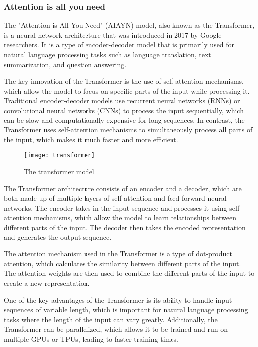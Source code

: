 \subsubsection{Attention is all you need}

The "Attention is All You Need" (AIAYN) model, also known as the Transformer, is a neural network architecture that was introduced in 2017 by Google researchers.
It is a type of encoder-decoder model that is primarily used for natural language processing tasks such as language translation, text summarization, and question answering.

The key innovation of the Transformer is the use of self-attention mechanisms, which allow the model to focus on specific parts of the input while processing it.
Traditional encoder-decoder models use recurrent neural networks (RNNs) or convolutional neural networks (CNNs) to process the input sequentially, which can be slow and computationally expensive for long sequences.
In contrast, the Transformer uses self-attention mechanisms to simultaneously process all parts of the input, which makes it much faster and more efficient.

\begin{figure}[!htbp]
  \centering
  \texttt{[image: transformer]}
  \caption{The transformer model \cite{vaswani}}
\end{figure}

The Transformer architecture consists of an encoder and a decoder, which are both made up of multiple layers of self-attention and feed-forward neural networks.
The encoder takes in the input sequence and processes it using self-attention mechanisms, which allow the model to learn relationships between different parts of the input.
The decoder then takes the encoded representation and generates the output sequence.

The attention mechanism used in the Transformer is a type of dot-product attention, which calculates the similarity between different parts of the input.
The attention weights are then used to combine the different parts of the input to create a new representation.

One of the key advantages of the Transformer is its ability to handle input sequences of variable length, which is important for natural language processing tasks where the length of the input can vary greatly.
Additionally, the Transformer can be parallelized, which allows it to be trained and run on multiple GPUs or TPUs, leading to faster training times.

